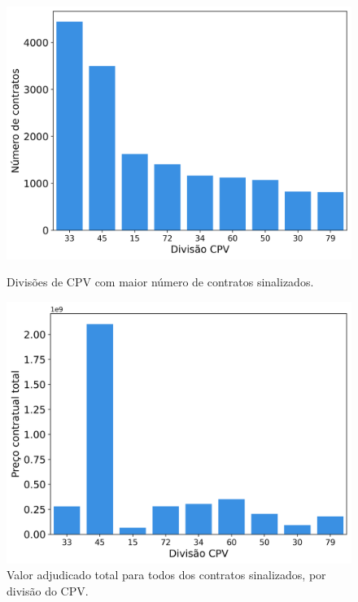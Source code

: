 \begin{figure}[H]
	\centering
	\begin{minipage}{.48\linewidth}
		\includegraphics[width=\linewidth]{imagens/r018/main_cpvs.png}
		\caption{Divisões de CPV com maior número de contratos sinalizados.}
	\end{minipage}
	\hfill
	\begin{minipage}{.49\linewidth}
		\includegraphics[width=\linewidth]{imagens/r018/prices.png}
		\caption{Valor adjudicado total para todos dos contratos sinalizados, por divisão do CPV.}
	\end{minipage}
\end{figure}










